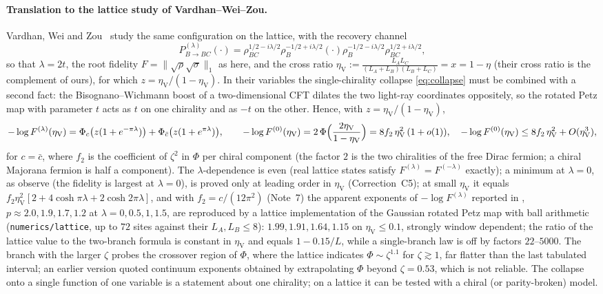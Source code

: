 \documentclass[11pt]{article}
\theoremstyle{accent}
\theoremstyle{definition}
\begin{document}
\paragraph{Translation to the lattice study of Vardhan--Wei--Zou.}
Vardhan, Wei and Zou~\cite{VardhanWeiZou} study the same configuration on the lattice, with the recovery channel
\[
 P^{(\lambda)}_{B\to BC}(\cdot)=\rho_{BC}^{1/2-i\lambda/2}\rho_B^{-1/2+i\lambda/2}(\cdot)\rho_B^{-1/2-i\lambda/2}\rho_{BC}^{1/2+i\lambda/2},
\]
so that \(\lambda=2t\), the root fidelity \(F=\|\sqrt\rho\sqrt\sigma\|_1\) as here, and the cross ratio
\(\eta_{\mathrm V}:=\frac{L_AL_C}{(L_A+L_B)(L_B+L_C)}=x=1-\eta\) (their cross ratio is the complement of ours), for which \(z=\eta_{\mathrm V}/(1-\eta_{\mathrm V})\).  In their variables the single-chirality collapse \eqref{eq:collapse} must be combined with a second fact: the Bisognano--Wichmann boost of a two-dimensional CFT dilates the two light-ray coordinates oppositely, so the rotated Petz map with parameter \(t\) acts as \(t\) on one chirality and as \(-t\) on the other.  Hence, with \(z=\eta_{\mathrm V}/(1-\eta_{\mathrm V})\),
\begin{equation}\label{eq:collapse-vwz}
 -\log F^{(\lambda)}(\eta_{\mathrm V})=\Phi_{c}\bigl(z(1+e^{-\pi\lambda})\bigr)+\Phi_{\bar c}\bigl(z(1+e^{\pi\lambda})\bigr),\qquad
 -\log F^{(0)}(\eta_{\mathrm V})=2\,\Phi\Bigl(\frac{2\eta_{\mathrm V}}{1-\eta_{\mathrm V}}\Bigr)=8f_2\,\eta_{\mathrm V}^2\,(1+o(1)),\quad -\log F^{(0)}(\eta_{\mathrm V})\le8f_2\,\eta_{\mathrm V}^2+O(\eta_{\mathrm V}^3),
\end{equation}
for \(c=\bar c\), where \(f_2\) is the coefficient of \(\zeta^2\) in \(\Phi\) per chiral component (the factor \(2\) is the two chiralities of the free Dirac fermion; a chiral Majorana fermion is half a component).  The \(\lambda\)-dependence is even (real lattice states satisfy \(F^{(\lambda)}=F^{(-\lambda)}\) exactly); a minimum at \(\lambda=0\), as \cite{VardhanWeiZou} observe (the fidelity is largest at \(\lambda=0\)), is proved only at leading order in \(\eta_{\mathrm V}\) (Correction~C5); at small \(\eta_{\mathrm V}\) it equals \(f_2\eta_{\mathrm V}^2[2+4\cosh\pi\lambda+2\cosh2\pi\lambda]\), and with \(f_2=c/(12\pi^2)\) (Note~7) the apparent exponents of \(-\log F^{(\lambda)}\) reported in \cite{VardhanWeiZou}, \(p\approx2.0,1.9,1.7,1.2\) at \(\lambda=0,0.5,1,1.5\), are reproduced by a lattice implementation of the Gaussian rotated Petz map with ball arithmetic (\texttt{numerics/lattice}, up to \(72\) sites against their \(L_A,L_B\le8\)): \(1.99,1.91,1.64,1.15\) on \(\eta_{\mathrm V}\le0.1\), strongly window dependent; the ratio of the lattice value to the two-branch formula is constant in \(\eta_{\mathrm V}\) and equals \(1-0.15/L\), while a single-branch law is off by factors \(22\)--\(5000\).  The branch with the larger \(\zeta\) probes the crossover region of \(\Phi\), where the lattice indicates \(\Phi\sim\zeta^{1.1}\) for \(\zeta\gtrsim1\), far flatter than the last tabulated interval; an earlier version quoted continuum exponents obtained by extrapolating \(\Phi\) beyond \(\zeta=0.53\), which is not reliable.  The collapse onto a single function of one variable is a statement about one chirality; on a lattice it can be tested with a chiral (or parity-broken) model.
\end{document}
